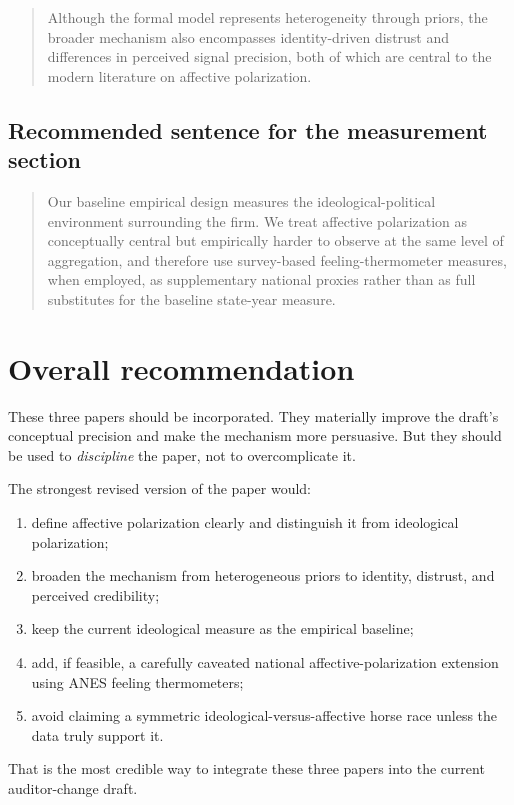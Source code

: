 \documentclass[12pt]{article}
\begin{document}
\begin{quote}
Although the formal model represents heterogeneity through priors, the broader mechanism also encompasses identity-driven distrust and differences in perceived signal precision, both of which are central to the modern literature on affective polarization.
\end{quote}

\subsection*{Recommended sentence for the measurement section}

\begin{quote}
Our baseline empirical design measures the ideological-political environment surrounding the firm. We treat affective polarization as conceptually central but empirically harder to observe at the same level of aggregation, and therefore use survey-based feeling-thermometer measures, when employed, as supplementary national proxies rather than as full substitutes for the baseline state-year measure.
\end{quote}

\section{Overall recommendation}

These three papers should be incorporated. They materially improve the draft's conceptual precision and make the mechanism more persuasive. But they should be used to \emph{discipline} the paper, not to overcomplicate it.

The strongest revised version of the paper would:
\begin{enumerate}
    \item define affective polarization clearly and distinguish it from ideological polarization;
    \item broaden the mechanism from heterogeneous priors to identity, distrust, and perceived credibility;
    \item keep the current ideological measure as the empirical baseline;
    \item add, if feasible, a carefully caveated national affective-polarization extension using ANES feeling thermometers;
    \item avoid claiming a symmetric ideological-versus-affective horse race unless the data truly support it.
\end{enumerate}

That is the most credible way to integrate these three papers into the current auditor-change draft.
\end{document}
